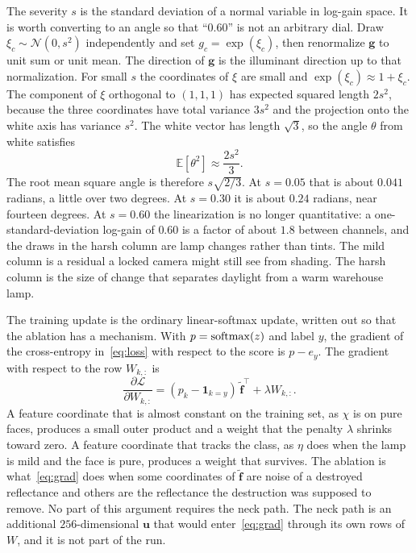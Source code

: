 The severity $s$ is the standard deviation of a normal variable in log-gain space. It is worth converting to an angle so that ``$0.60$'' is not an arbitrary dial. Draw $\xi_c\sim\mathcal{N}(0,s^{2})$ independently and set $g_c=\exp(\xi_c)$, then renormalize $\mathbf{g}$ to unit sum or unit mean. The direction of $\mathbf{g}$ is the illuminant direction up to that normalization. For small $s$ the coordinates of $\xi$ are small and $\exp(\xi_c)\approx 1+\xi_c$. The component of $\xi$ orthogonal to $(1,1,1)$ has expected squared length $2s^{2}$, because the three coordinates have total variance $3s^{2}$ and the projection onto the white axis has variance $s^{2}$. The white vector has length $\sqrt{3}$, so the angle $\theta$ from white satisfies
\begin{equation}
\mathbb{E}[\theta^{2}]
\approx
\frac{2s^{2}}{3}.
\label{eq:angle}
\end{equation}
The root mean square angle is therefore $s\sqrt{2/3}$. At $s=0.05$ that is about $0.041$ radians, a little over two degrees. At $s=0.30$ it is about $0.24$ radians, near fourteen degrees. At $s=0.60$ the linearization is no longer quantitative: a one-standard-deviation log-gain of $0.60$ is a factor of about $1.8$ between channels, and the draws in the harsh column are lamp changes rather than tints. The mild column is a residual a locked camera might still see from shading. The harsh column is the size of change that separates daylight from a warm warehouse lamp.

The training update is the ordinary linear-softmax update, written out so that the ablation has a mechanism. With $p=\operatorname{softmax}(z)$ and label $y$, the gradient of the cross-entropy in~\eqref{eq:loss} with respect to the score is $p-e_{y}$. The gradient with respect to the row $W_{k,:}$ is
\begin{equation}
\frac{\partial\mathcal{L}}{\partial W_{k,:}}
= (p_k-\mathbf{1}_{k=y})\,\tilde{\mathbf{f}}^{\top}
+ \lambda W_{k,:}.
\label{eq:grad}
\end{equation}
A feature coordinate that is almost constant on the training set, as $\chi$ is on pure faces, produces a small outer product and a weight that the penalty $\lambda$ shrinks toward zero. A feature coordinate that tracks the class, as $\eta$ does when the lamp is mild and the face is pure, produces a weight that survives. The ablation is what~\eqref{eq:grad} does when some coordinates of $\tilde{\mathbf{f}}$ are noise of a destroyed reflectance and others are the reflectance the destruction was supposed to remove. No part of this argument requires the neck path. The neck path is an additional $256$-dimensional $\mathbf{u}$ that would enter~\eqref{eq:grad} through its own rows of $W$, and it is not part of the run.

